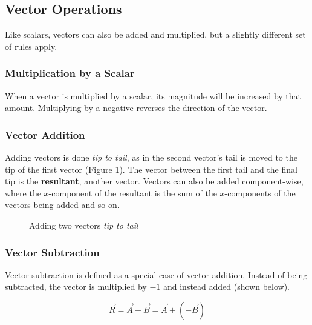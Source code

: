 \documentclass[12pt]{article}
\begin{document}
\subsection{Vector Operations}
Like scalars, vectors can also be added and multiplied, but a slightly different set of rules apply.

\subsubsection*{Multiplication by a Scalar}
When a vector is multiplied by a scalar, its magnitude will be increased by that amount. 
Multiplying by a negative reverses the direction of the vector.

\subsubsection*{Vector Addition}
Adding vectors is done \textit{tip to tail}, as in the second vector's tail is moved to the tip of the first vector (Figure 1).
The vector between the first tail and the final tip is the \textbf{resultant}, another vector.
Vectors can also be added component-wise, where the $x$-component of the resultant is the sum of the $x$-components of the vectors being added and so on.

\begin{figure}
\centering
{}
\caption{Adding two vectors \textit{tip to tail}}
\end{figure}

\subsubsection*{Vector Subtraction}
Vector subtraction is defined as a special case of vector addition.
Instead of being subtracted, the vector is multiplied by $-1$ and instead added (shown below).

\begin{equation*}
    \vec{R} = \vec{A} - \vec{B} = \vec{A} + \left(-\vec{B}\right)
\end{equation*}
\end{document}
